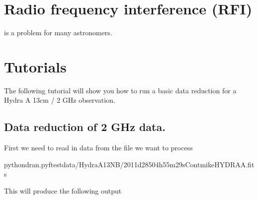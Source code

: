 \documentclass[letterpaper,10pt,english]{sphinxmanual}
\begin{document}
\section{Radio frequency interference (RFI)}
\label{\detokenize{extras/rfi:radio-frequency-interference-rfi}}\label{\detokenize{extras/rfi::doc}}
\sphinxAtStartPar
{} is a problem for many astronomers.

\sphinxstepscope


\section{Tutorials}
\label{\detokenize{extras/tuts/tutorials:tutorials}}\label{\detokenize{extras/tuts/tutorials::doc}}
\sphinxAtStartPar
The following tutorial will show you how to run a basic data
reduction for a Hydra A 13cm / 2 GHz observation.


\subsection{Data reduction of 2 GHz data.}
\label{\detokenize{extras/tuts/tutorials:data-reduction-of-2-ghz-data}}
\sphinxAtStartPar
First we need to read in data from the file we want to process

\begin{sphinxVerbatim}[commandchars=\\\{\}]
\PYGZdl{}pythondran.py\PYGZhy{}ftest\PYGZus{}data/HydraA\PYGZus{}13NB/2011d285\PYGZus{}04h55m29s\PYGZus{}Cont\PYGZus{}mike\PYGZus{}HYDRA\PYGZus{}A.fits
\end{sphinxVerbatim}

\sphinxAtStartPar
This will produce the following output
\end{document}
